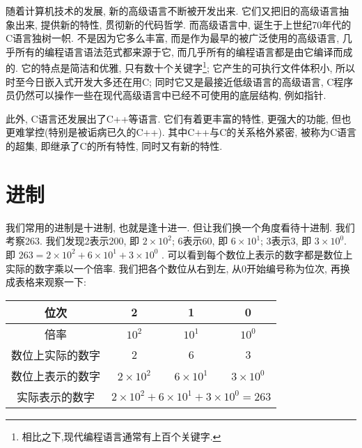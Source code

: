         随着计算机技术的发展, 新的高级语言不断被开发出来. 它们又把旧的高级语言抽象出来, 提供新的特性, 贯彻新的代码哲学. 而高级语言中, 诞生于上世纪70年代的C语言独树一帜. 不是因为它多么丰富, 而是作为最早的被广泛使用的高级语言, 几乎所有的编程语言语法范式都来源于它, 而几乎所有的编程语言都是由它编译而成的. 它的特点是简洁和优雅, 只有数十个关键字\footnote{相比之下,现代编程语言通常有上百个关键字.}; 它产生的可执行文件体积小, 所以时至今日嵌入式开发大多还在用C; 同时它又是最接近低级语言的高级语言, C程序员仍然可以操作一些在现代高级语言中已经不可使用的底层结构, 例如指针. 
        
        此外, C语言还发展出了C++等语言. 它们有着更丰富的特性, 更强大的功能, 但也更难掌控(特别是被诟病已久的C++). 其中C++与C的关系格外紧密, 被称为C语言的超集, 即继承了C的所有特性, 同时又有新的特性.

    \section{进制} \label{进制}
        我们常用的进制是十进制, 也就是逢十进一. 但让我们换一个角度看待十进制.
        我们考察263. 我们发现2表示200, 即 $ 2 \times 10 ^ 2 $; 6表示60, 即 $ 6 \times 10 ^ 1 $; 3表示3, 即 $ 3 \times 10 ^ 0 $. 即 $ 263 = 2 \times 10 ^ 2 + 6 \times 10 ^ 1 + 3 \times 10 ^ 0 $ . 可以看到每个数位上表示的数字都是数位上实际的数字乘以一个倍率. 我们把各个数位从右到左, 从0开始编号称为位次, 再换成表格来观察一下:
        \begin{center}
            \begin{tabular}{|c|c|c|c|}
                \hline
                位次                & 2                     & 1                     & 0                     \\
                \hline
                倍率                & $ 10 ^ 2 $            & $ 10 ^ 1 $            & $ 10 ^ 0 $            \\
                \hline
                数位上实际的数字     & 2                     & 6                     & 3                     \\
                \hline
                数位上表示的数字     & $ 2 \times 10 ^ 2 $   & $ 6 \times 10 ^ 1 $   & $ 3 \times 10 ^ 0 $   \\
                \hline
                实际表示的数字       & \multicolumn{3}{|c|}{ $ 2 \times 10 ^ 2 + 6 \times 10 ^ 1 + 3 \times 10 ^ 0 = 263 $ }\\
                \hline
            \end{tabular}
        \end{center}

